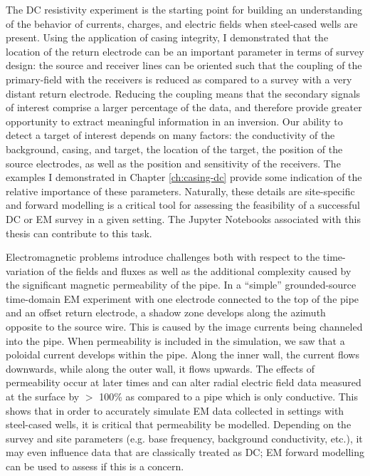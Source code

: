 The DC resistivity experiment is the starting point for building an understanding of the behavior of currents, charges, and electric fields when steel-cased wells are present. Using the application of casing integrity, I demonstrated that the location of the return electrode can be an important parameter in terms of survey design: the source and receiver lines can be oriented such that the coupling of the primary-field with the receivers is reduced as compared to a survey with a very distant return electrode. Reducing the coupling means that the secondary signals of interest comprise a larger percentage of the data, and therefore provide greater opportunity to extract meaningful information in an inversion. Our ability to detect a target of interest depends on many factors: the conductivity of the background, casing, and target, the location of the target, the position of the source electrodes, as well as the position and sensitivity of the receivers. The examples I demonstrated in Chapter \ref{ch:casing-dc} provide some indication of the relative importance of these parameters. Naturally, these details are site-specific and forward modelling is a critical tool for assessing the feasibility of a successful DC or EM survey in a given setting. The Jupyter Notebooks associated with this thesis can contribute to this task.

Electromagnetic problems introduce challenges both with respect to the time-variation of the fields and fluxes as well as the additional complexity caused by the significant magnetic permeability of the pipe. In a ``simple'' grounded-source time-domain EM experiment with one electrode connected to the top of the pipe and an offset return electrode, a shadow zone develops along the azimuth opposite to the source wire. This is caused by the image currents being channeled into the pipe. When permeability is included in the simulation, we saw that a poloidal current develops within the pipe. Along the inner wall, the current flows downwards, while along the outer wall, it flows upwards. The effects of permeability occur at later times and can alter radial electric field data measured at the surface by $>$ 100\% as compared to a pipe which is only conductive. This shows that in order to accurately simulate EM data collected in settings with steel-cased wells, it is critical that permeability be modelled. Depending on the survey and site parameters (e.g. base frequency, background conductivity, etc.), it may even influence data that are classically treated as DC; EM forward modelling can be used to assess if this is a concern.

